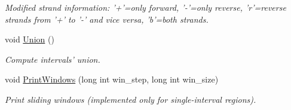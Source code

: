 \begin{CompactItemize}
\begin{CompactList}\small\item\em Modified strand information: '+'=only forward, '-'=only reverse, 'r'=reverse strands from '+' to '-' and vice versa, 'b'=both strands. \item\end{CompactList}\item 
\hypertarget{classGenomicRegionSAM_6161ba10d2a4871cc43aa5bc597a787b}{
void \hyperlink{classGenomicRegionSAM_6161ba10d2a4871cc43aa5bc597a787b}{Union} ()}
\label{classGenomicRegionSAM_6161ba10d2a4871cc43aa5bc597a787b}

\begin{CompactList}\small\item\em Compute intervals' union. \item\end{CompactList}\item 
\hypertarget{classGenomicRegionSAM_27027bc80a3b5a864ebafd415a6ef5a6}{
void \hyperlink{classGenomicRegionSAM_27027bc80a3b5a864ebafd415a6ef5a6}{PrintWindows} (long int win\_\-step, long int win\_\-size)}
\label{classGenomicRegionSAM_27027bc80a3b5a864ebafd415a6ef5a6}

\begin{CompactList}\small\item\em Print sliding windows (implemented only for single-interval regions). \item\end{CompactList}\end{CompactItemize}
